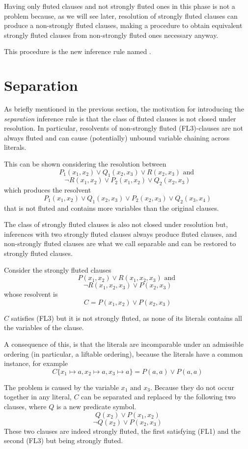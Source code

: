 Having only fluted clauses and not strongly fluted ones in this phase is not a problem because, as we will see later, resolution of strongly fluted clauses can produce a non-strongly fluted clauses, making a procedure to obtain equivalent strongly fluted clauses from non-strongly fluted ones necessary anyway.

This procedure is the new inference rule named .
\section{Separation}\label{sec:separation}
As briefly mentioned in the previous section, the motivation for introducing the \emph{separation} inference rule is that the class of fluted clauses is not closed under resolution.
In particular, resolvents of non-strongly fluted (FL3)-clauses are not always fluted and can cause (potentially) unbound variable chaining across literals.

This can be shown considering the resolution between
  \[
    P_1(x_1,x_2) \lor Q_1(x_2,x_3) \lor R(x_2,x_3) \text{ and }
  \]
  \[
  \neg R(x_1,x_2) \lor P_2(x_1,x_2) \lor Q_2(x_2,x_3)
  \]
which produces the resolvent
  \[
    P_1(x_1,x_2) \lor Q_1(x_2,x_3) \lor P_2(x_2,x_3) \lor Q_2(x_3,x_4)
  \]
that is not fluted and contains more variables than the original clauses.

The class of strongly fluted clauses is also not closed under resolution but, inferences with two strongly fluted clauses always produce fluted clauses, and non-strongly fluted clauses are what we call separable and can be restored to strongly fluted clauses.

Consider the strongly fluted clauses
  \[
    P(x_1,x_2) \lor R(x_1,x_2,x_3) \text{ and }
  \]
  \[
  \neg R(x_1,x_2,x_3) \lor P(x_2,x_3)
  \]
whose resolvent is
  \[
    C = P(x_1,x_2) \lor P(x_2,x_3)
  \]

\(C\) satisfies (FL3) but it is not strongly fluted, as none of its literals contains all the variables of the clause.

A consequence of this, is that the literals are incomparable under an admissible ordering (in particular, a liftable ordering), because the literals have a common instance, for example
  \[
    C\{x_1 \mapsto a, x_2 \mapsto a, x_3 \mapsto a\} = P(a,a) \lor P(a,a)
  \]

The problem is caused by the variable \(x_1 \text{ and } x_3\). Because they do not occur together in any literal, \(C\) can be separated and replaced by the following two clauses, where \(Q\) is a new predicate symbol.
  \[
    Q(x_2) \lor P(x_1,x_2)
  \]
  \[
    \neg Q(x_2) \lor P(x_2,x_3)
  \]
These two clauses are indeed strongly fluted, the first satisfying (FL1) and the second (FL3) but being strongly fluted.

